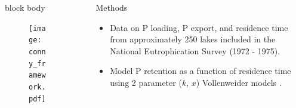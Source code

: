 \documentclass[final,hyperref={pdfpagelabels=false}]{beamer}
\begin{document}
\begin{frame}[t]
\begin{columns}[t]
\begin{column}{.465\textwidth}
{\begin{beamercolorbox}[wd=\textwidth,rounded=true]{block body}
\begin{figure}
  \texttt{[image: conny\_framework.pdf]}
\end{figure}

\end{beamercolorbox}
}


\end{column} %

\begin{column}{.03\textwidth}\end{column} %
 
\begin{column}{.465\textwidth} %

\begin{block}{Methods}

\begin{itemize}
\item Data on P loading, P export, and residence time from approximately 250 lakes included in the National Eutrophication Survey (1972 - 1975)\cite{StachelekNationalEutrophicationSurvey2017}.
\vspace{1em}
\item Model P retention as a function of residence time using 2 parameter ($k$, $x$) Vollenweider models \cite{Brettreviewreassessmentlake2007}.

\end{itemize}



\end{block}
\end{column}
\end{columns}
\end{frame}
\end{document}
